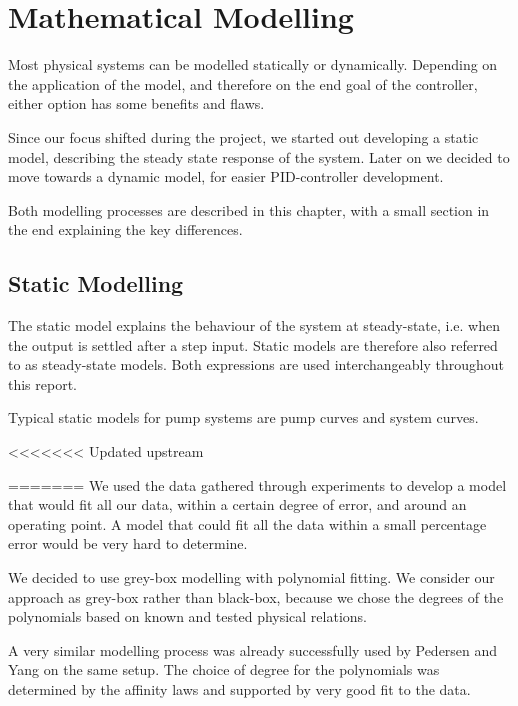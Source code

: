 \chapter{Mathematical Modelling}\label{ch:mathmodel}

Most physical systems can be modelled statically or dynamically.
Depending on the application of the model,
and therefore on the end goal of the controller,
either option has some benefits and flaws.

Since our focus shifted during the project, we started out developing a static model,
describing the steady state response of the system.
Later on we decided to move towards a dynamic model, for easier PID-controller development.

Both modelling processes are described in this chapter,
with a small section in the end explaining the key differences.
\section{Static Modelling}\label{sec:statmod}

The static model explains the behaviour of the system at steady-state,
i.e. when the output is settled after a step input.
Static models are therefore also referred to as steady-state models.
Both expressions are used interchangeably throughout this report.

Typical static models for pump systems are pump curves and system curves.

\newpage
<<<<<<< Updated upstream

=======
We used the data gathered through experiments to develop a model that would fit all our data,
within a certain degree of error, and around an operating point. A model that could fit all the 
data within a small percentage error would be very hard to determine.

We decided to use grey-box modelling with polynomial fitting.
We consider our approach as grey-box rather than black-box,
because we chose the degrees of the polynomials based on known and tested physical relations.

A very similar modelling process was already successfully used by Pedersen and Yang 
\cite{YangMultiPump2008} on the same setup.
The choice of degree for the polynomials was determined by the affinity laws \cite{Volk2014}
and supported by very good fit to the data.

